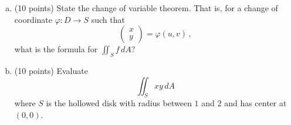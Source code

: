 \documentclass[12pt]{article}
\begin{document}
\newpage
\begin{problem}
    \begin{enumerate}[(a)]
        \item (10 points) State the change of variable theorem. That is, for a change of coordinate
        $\varphi: D \to S$ such that
        \begin{equation*}
            \begin{pmatrix}
                x \\ y
            \end{pmatrix}
            = \varphi(u,v) \,,
        \end{equation*}
        what is the formula for 
        $\iint_S f \, dA$?
    \item (10 points) Evaluate
        \begin{equation*}
            \iint_S xy \, dA
        \end{equation*}
        where $S$ is the hollowed disk with radius between $1$ and $2$ and has center at $(0,0)$.

        \begin{figure}[ht] 
            \begin{center}
            \end{center}
        \end{figure}
        
        
\end{enumerate}
\end{problem}
%
\end{document}
